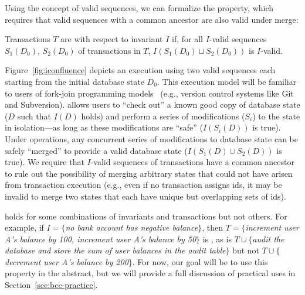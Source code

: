 Using the concept of valid sequences, we can formalize the
\iconfluence property, which requires that valid sequences with a
common ancestor are also valid under merge:

\begin{definition}[\iconfluence]
Transactions $T$ are \iconfluent with respect to invariant $I$ if, for
all $I$-valid sequences $S_1(D_0)$, $S_2(D_0)$ of transactions in $T$,
$I(S_1(D_0) \sqcup S_2(D_0))$ is $I$-valid.
\end{definition}

Figure~\ref{fig:iconfluence} depicts an \iconfluent execution using
two valid sequences each starting from the initial database state
$D_0$. This execution model will be familiar to users of fork-join
programming models~\cite{hewitt-forkjoin} (e.g., version control
systems like Git and Subversion). \iconfluence allows users to ``check
out'' a known good copy of database state ($D$ such that $I(D)$ holds)
and perform a series of modifications ($S_i$) to the state in
isolation---as long as these modifications are ``safe'' ($I(S_i(D))$
is true). Under \iconfluent operations, any concurrent series of
modifications to database state can be safely ``merged'' to provide a
valid database state ($I(S_1(D) \cup S_2(D))$ is true). We require
that $I$-valid sequences of transactions have a common ancestor to
rule out the possibility of merging arbitrary states that could not
have arisen from transaction execution (e.g., even if no transaction
assigns ids, it may be invalid to merge two states that each have
unique but overlapping sets of ids).

\iconfluence holds for some combinations of invariants and
transactions but not others. For example, if $I=\{$\textit{no bank
  account has negative balance}$\}$, then $T=\{$\textit{increment user
  A's balance by 100, increment user A's balance by 50}$\}$ is
\iconfluent, as is $T\cup\{$\textit{audit the database and store the
  sum of user balances in the \textrm{audit} table}$\}$ but not
$T\cup\{$\textit{decrement user A's balance by 200}$\}$. For now, our
goal will be to use this property in the abstract, but we will provide
a full discussion of practical uses in Section~\ref{sec:bcc-practice}.

